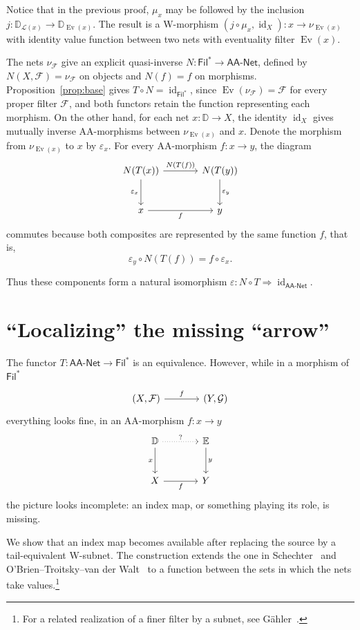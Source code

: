 \documentclass[11pt,a4paper]{article}
\theoremstyle{definition}
\theoremstyle{remark}
\newcommand{\Filp}{\mathsf{Fil}^{*}}
\newcommand{\NetAA}{\mathsf{AA\text{-}Net}}
\newcommand{\FF}{\mathcal F}
\newcommand{\GG}{\mathcal G}
\newcommand{\Ev}{\operatorname{Ev}}
\newcommand{\Tail}{\mathcal L}
\newcommand{\id}{\operatorname{id}}
\begin{document}
Notice that in the previous proof, \(\mu_x\) may be followed by
the inclusion \(j:\mathbb D_{\Tail(x)}\to\mathbb D_{\Ev(x)}\).
The result is a W-morphism \((j\circ\mu_x,\id_X):x\to\nu_{\Ev(x)}\)
with identity value function between two nets with eventuality
filter \(\Ev(x)\).

The nets \(\nu_{\FF}\) give an explicit quasi-inverse
\(N:\Filp\to\NetAA\), defined by \(N(X,\FF)=\nu_{\FF}\) on
objects and \(N(f)=f\) on morphisms.
Proposition~\ref{prop:base} gives \(T\circ N=\id_{\Filp}\), since
\(\Ev(\nu_{\FF})=\FF\) for every proper filter \(\FF\), and both
functors retain the function representing each morphism.
On the other hand, for each net \(x:\mathbb D\to X\), the identity
\(\id_X\) gives mutually inverse AA-morphisms between
\(\nu_{\Ev(x)}\) and \(x\). Denote the morphism from
\(\nu_{\Ev(x)}\) to \(x\) by \(\varepsilon_x\). For every
AA-morphism \(f:x\to y\), the diagram
\[
\begin{tikzcd}[row sep=large,column sep=large]
N(T(x)) \arrow[r,"N(T(f))"] \arrow[d,"\varepsilon_x"'] &
N(T(y)) \arrow[d,"\varepsilon_y"] \\
x \arrow[r,"f"'] & y
\end{tikzcd}
\]
commutes because both composites are represented by the same
function \(f\), that is,
\[
 \varepsilon_y\circ N(T(f))=f\circ\varepsilon_x.
\]

Thus these components form a natural isomorphism
\(\varepsilon:N\circ T\Rightarrow\id_{\NetAA}\).

\section{``Localizing'' the missing ``arrow''}\label{sec:graphs}
The functor \(T:\NetAA\to\Filp\) is an equivalence. However, while in
a morphism of \(\Filp\)
\[
\begin{tikzcd}[column sep=large]
(X,\FF) \arrow[r,"f"] & (Y,\GG)
\end{tikzcd}
\]
everything looks fine, in an AA-morphism \(f:x\to y\)
\[
\begin{tikzcd}[column sep=large,row sep=large]
\mathbb D \arrow[r,dotted,"?"] \arrow[d,"x"'] & \mathbb E \arrow[d,"y"] \\
X \arrow[r,"f"'] & Y
\end{tikzcd}
\]
the picture looks incomplete: an index map, or something playing its
role, is missing.

We show that an index map becomes available
after replacing the source by a tail-equivalent W-subnet. The
construction extends the one in Schechter~\cite[Lemma 7.18 and
Corollary 7.19]{Schechter} and
O'Brien--Troitsky--van der Walt~\cite[Proposition 2.2]{OTW}
to a function between the sets in which the nets take values.\footnote{For
a related realization of a finer filter by a subnet, see
G\"ahler~\cite[Theorem 2.8.4, pp. 82--83]{Gaehler}.}
\end{document}
